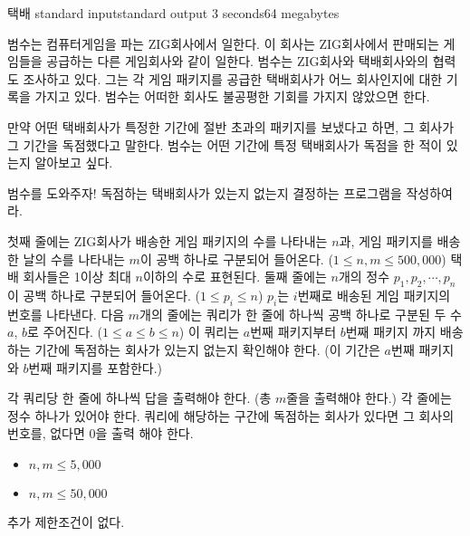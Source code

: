 \begin{problem}{택배}
	{standard input}{standard output}
	{3 seconds}{64 megabytes}{}
	
	범수는 컴퓨터게임을 파는 ZIG회사에서 일한다. 이 회사는 ZIG회사에서 판매되는 게임들을 공급하는 다른 게임회사와 같이 일한다. 범수는 ZIG회사와 택배회사와의 협력도 조사하고 있다. 그는 각 게임 패키지를 공급한 택배회사가 어느 회사인지에 대한 기록을 가지고 있다. 범수는 어떠한 회사도 불공평한 기회를 가지지 않았으면 한다.
	
	만약 어떤 택배회사가 특정한 기간에 절반 초과의 패키지를 보냈다고 하면, 그 회사가 그 기간을 독점했다고 말한다. 범수는 어떤 기간에 특정 택배회사가 독점을 한 적이 있는지 알아보고 싶다.
	 
	범수를 도와주자! 독점하는 택배회사가 있는지 없는지 결정하는 프로그램을 작성하여라.
	
	
	
	\InputFile
	
	첫째 줄에는 ZIG회사가 배송한 게임 패키지의 수를 나타내는 $n$과, 게임 패키지를 배송한 날의 수를 나타내는 $m$이 공백 하나로 구분되어 들어온다. ($1 \le n, m \le 500,000$)
	택배 회사들은 1이상 최대 $n$이하의 수로 표현된다.
	둘째 줄에는 $n$개의 정수 $p_1, p_2, \cdots, p_n$이 공백 하나로 구분되어 들어온다. ($1 \le p_i \le n$) $p_i$는 $i$번째로 배송된 게임 패키지의 번호를 나타낸다. 
	다음 $m$개의 줄에는 쿼리가 한 줄에 하나씩 공백 하나로 구분된 두 수 $a$, $b$로 주어진다. ($1 \le a \le b \le n$) 이 쿼리는 $a$번째 패키지부터 $b$번째 패키지 까지 배송하는 기간에 독점하는 회사가 있는지 없는지 확인해야 한다. (이 기간은 $a$번째 패키지와 $b$번째 패키지를 포함한다.)
	

	
	\OutputFile
	
	각 쿼리당 한 줄에 하나씩 답을 출력해야 한다. (총 $m$줄을 출력해야 한다.) 각 줄에는 정수 하나가 있어야 한다. 쿼리에 해당하는 구간에 독점하는 회사가 있다면 그 회사의 번호를, 없다면 0을 출력 해야 한다.
	
	
	\begin{itemize}
		\item $n, m \le 5,000$
	\end{itemize}
	
	\begin{itemize}
		\item $n, m \le 50,000$
	\end{itemize}
	
	
	추가 제한조건이 없다.
	
	\Examples
		
	\begin{example}
	\end{example}
	
	
	
	
	
\end{problem}

